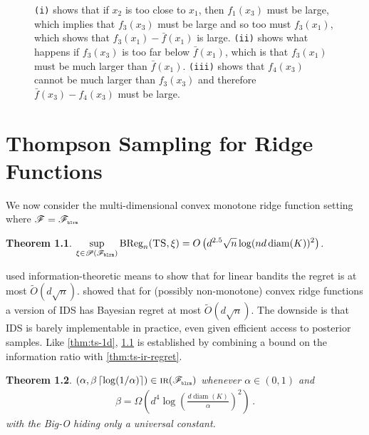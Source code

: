 \documentclass[letter, 12pt]{report}
\newcommand{\pr}{\text{\tiny\texttt{r}}}
\newcommand{\pb}{\text{\tiny\texttt{b}}}
\newcommand{\pl}{\text{\tiny\texttt{l}}}
\renewcommand{\pm}{\text{\tiny\texttt{m}}}
\newcommand{\ceil}[1]{\left\lceil #1 \right\rceil}
\newcommand{\BReg}{\textrm{BReg}}
\newcommand{\sF}{\mathscr F}
\newcommand{\sP}{\mathscr P}
\newcommand{\diam}{\operatorname{diam}}
\newcommand{\1}{\mathbf{1}}
\newcommand{\IR}{\operatorname{\textsc{ir}}}
\newcommand{\ts}{\textsc{TS}\xspace}
\newcommand{\IDS}{\textsc{IDS}}
\theoremstyle{plain}
\newtheorem{theorem}{Theorem}
\theoremstyle{definition}
\theoremstyle{remark}
\begin{document}
\begin{figure}[h!]

    \caption{
        \texttt{(i)} shows that if $x_2$ is too close to $x_1$, then $f_1(x_3)$ must be large, which implies that $f_3(x_3)$ must be large
        and so too must $f_3(x_1)$, which shows that $f_3(x_1) - \bar f(x_1)$ is large.
        \texttt{(ii)} shows what happens if $f_3(x_3)$ is too far below $\bar f(x_1)$, which is that $f_3(x_1)$ must be much larger than $\bar f(x_1)$.
        \texttt{(iii)} shows that $f_4(x_3)$ cannot be much larger than $f_3(x_3)$ and therefore $\bar f(x_3) - f_4(x_3)$ must be large.
    }
    \label{fig:ts}
\end{figure}

\chapter{Thompson Sampling for Ridge Functions}

We now consider the multi-dimensional convex monotone ridge function setting where $\sF = \sF_{\pb\pl\pr\pm}$

\begin{theorem}\label{thm:ts-ridge}
    $\displaystyle \sup_{\xi \in \sP(\sF_{\pb\pl\pr\pm})} \BReg_n(\ts, \xi) = O\left(d^{2.5} \sqrt{n} \log(n d \diam(K))^2\right)$.
\end{theorem}

\cite{RV16} used information-theoretic means to show that for linear bandits the regret is at most $\tilde O(d \sqrt{n})$.
\cite{lattimore2021minimax} showed that for (possibly non-monotone) convex ridge functions a version of \IDS{} has Bayesian regret at most $\tilde O(d \sqrt{n})$.
The downside is that \IDS{} is barely implementable in practice, even given efficient access to posterior samples.
Like \cref{thm:ts-1d}, \cref{thm:ts-ridge} is established by combining a bound on the information ratio with \cref{thm:ts-ir-regret}.

\begin{theorem}\label{thm:ridge-ir}
    $(\alpha, \beta \ceil{\log(1/\alpha)}) \in \IR(\sF_{\pb\pl\pr\pm})$ whenever $\alpha \in (0,1)$ and
    \begin{align*}
        \beta = \Omega\left(d^4 \log\left(\frac{d \diam(K)}{\alpha}\right)^2\right) \,.
    \end{align*}
    with the Big-O hiding only a universal constant.
\end{theorem}
\end{document}
